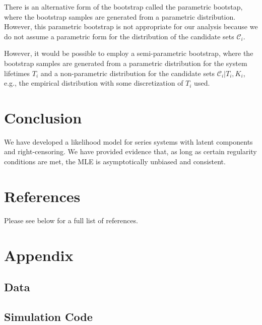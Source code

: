 \documentclass[
]{article}
\newenvironment{cslreferences}%
  {}%
  {\par}
\begin{document}
There is an alternative form of the bootstrap called the parametric
bootstap, where the bootstrap samples are generated from a parametric
distribution. However, this parametric bootstrap is not appropriate for
our analysis because we do not assume a parametric form for the
distribution of the candidate sets \(\mathcal{C}_i\).

However, it would be possible to employ a semi-parametric bootstrap,
where the bootstrap samples are generated from a parametric distribution
for the system lifetimes \(T_i\) and a non-parametric distribution for
the candidate sets \(\mathcal{C}_i | T_i, K_i\), e.g., the empirical
distribution with some discretization of \(T_i\) used.

\hypertarget{conclusion}{%
\section{Conclusion}\label{conclusion}}

We have developed a likelihood model for series systems with latent
components and right-censoring. We have provided evidence that, as long
as certain regularity conditions are met, the MLE is asymptotically
unbiased and consistent.

\hypertarget{references}{%
\section*{References}\label{references}}

Please see below for a full list of references.

\hypertarget{refs}{}
\begin{cslreferences}
\end{cslreferences}

\hypertarget{app}{%
\section{Appendix}\label{app}}

\hypertarget{app:data}{%
\subsection{Data}\label{app:data}}

\hypertarget{simulation-code}{%
\subsection*{Simulation Code}\label{simulation-code}}
\end{document}
